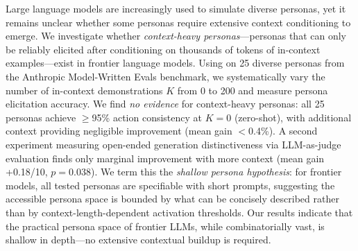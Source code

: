 Large language models are increasingly used to simulate diverse personas, yet it remains unclear whether some personas require extensive context conditioning to emerge. We investigate whether \emph{context-heavy personas}---personas that can only be reliably elicited after conditioning on thousands of tokens of in-context examples---exist in frontier language models. Using \gptmini on 25 diverse personas from the Anthropic Model-Written Evals benchmark, we systematically vary the number of in-context demonstrations $K$ from 0 to 200 and measure persona elicitation accuracy. We find \emph{no evidence} for context-heavy personas: all 25 personas achieve $\geq$95\% action consistency at $K{=}0$ (zero-shot), with additional context providing negligible improvement (mean gain $<$0.4\%). A second experiment measuring open-ended generation distinctiveness via LLM-as-judge evaluation finds only marginal improvement with more context (mean gain +0.18/10, $p{=}0.038$). We term this the \emph{shallow persona hypothesis}: for frontier models, all tested personas are specifiable with short prompts, suggesting the accessible persona space is bounded by what can be concisely described rather than by context-length-dependent activation thresholds. Our results indicate that the practical persona space of frontier LLMs, while combinatorially vast, is shallow in depth---no extensive contextual buildup is required.
